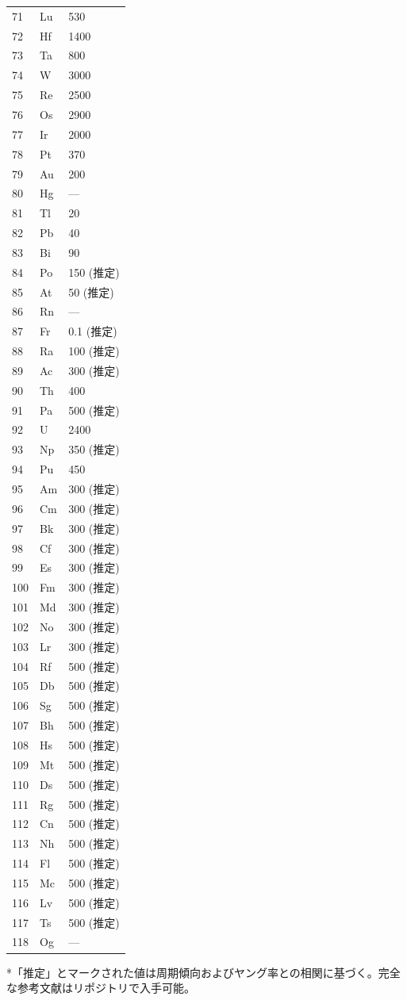 \documentclass[11pt,a4paper]{article}
\theoremstyle{remark}
\begin{document}
\begin{longtable}{p{0.6cm}p{1.2cm}p{2.5cm}}
		71 & Lu & 530 \\
		72 & Hf & 1400 \\
		73 & Ta & 800 \\
		74 & W  & 3000 \\
		75 & Re & 2500 \\
		76 & Os & 2900 \\
		77 & Ir & 2000 \\
		78 & Pt & 370 \\
		79 & Au & 200 \\
		80 & Hg & — \\
		81 & Tl & 20 \\
		82 & Pb & 40 \\
		83 & Bi & 90 \\
		84 & Po & 150 (推定) \\
		85 & At & 50 (推定) \\
		86 & Rn & — \\
		87 & Fr & 0.1 (推定) \\
		88 & Ra & 100 (推定) \\
		89 & Ac & 300 (推定) \\
		90 & Th & 400 \\
		91 & Pa & 500 (推定) \\
		92 & U  & 2400 \\
		93 & Np & 350 (推定) \\
		94 & Pu & 450 \\
		95 & Am & 300 (推定) \\
		96 & Cm & 300 (推定) \\
		97 & Bk & 300 (推定) \\
		98 & Cf & 300 (推定) \\
		99 & Es & 300 (推定) \\
		100& Fm & 300 (推定) \\
		101& Md & 300 (推定) \\
		102& No & 300 (推定) \\
		103& Lr & 300 (推定) \\
		104& Rf & 500 (推定) \\
		105& Db & 500 (推定) \\
		106& Sg & 500 (推定) \\
		107& Bh & 500 (推定) \\
		108& Hs & 500 (推定) \\
		109& Mt & 500 (推定) \\
		110& Ds & 500 (推定) \\
		111& Rg & 500 (推定) \\
		112& Cn & 500 (推定) \\
		113& Nh & 500 (推定) \\
		114& Fl & 500 (推定) \\
		115& Mc & 500 (推定) \\
		116& Lv & 500 (推定) \\
		117& Ts & 500 (推定) \\
		118& Og & — \\
		\bottomrule
	\end{longtable}
	*「推定」とマークされた値は周期傾向およびヤング率との相関に基づく。完全な参考文献はリポジトリで入手可能。
	
\end{document}
